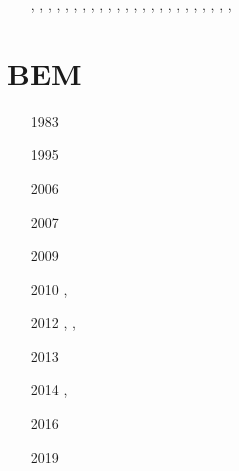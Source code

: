 \begin{small}
\begin{itemize}
\item[\twothousandtwentysix]   \textcite{lisb26},  \textcite{wabn26}, \textcite{kolc26},
                               \textcite{nebh26},  \textcite{lilz26}, \textcite{wali26},
                               \textcite{zhcp26},  \textcite{libe26}, \textcite{wale26},
                               \textcite{lexb26},  \textcite{nejc26}, \textcite{lilc26},
                               \textcite{lexb26},  \textcite{leck26}, \textcite{zwgb26},
                               \textcite{lipg26},  \textcite{kiwc26}, \textcite{tuhn26},
                               \textcite{kess26},  \textcite{ficm26}, \textcite{mumb26},
                               \textcite{pact26},  \textcite{gihb26}, \textcite{shjn26},
                               \textcite{lirj26}

\end{itemize}
\end{small}


\section{BEM} 

\begin{small}
\begin{itemize}
\item[1983] \textcite{crsr83}
\item[1995] \textcite{katl95}
\item[2006] \textcite{more06}
\item[2007] \textcite{moct07}
\item[2009] \textcite{moct09}
\item[2010] \textcite{moyb10}, \textcite{ribe10}
\item[2012] \textcite{qumm12}, \textcite{buqm12}, \textcite{liri12}
\item[2013] \textcite{quhm13}
\item[2014] \textcite{diwl14}, \textcite{lidr14}
\item[2016] \textcite{xuri16}
\item[2019] \textcite{gert19}
\end{itemize}
\end{small}

